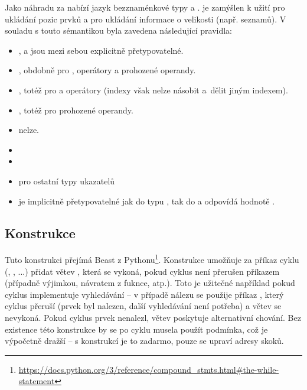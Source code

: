 Jako náhradu za  nabízí jazyk bezznaménkové typy  a .  je zamýšlen k užití pro ukládání pozic prvků a  pro ukládání informace o velikosti (např. seznamů). V souladu s touto sémantikou byla zavedena následující pravidla:
\begin{itemize}
	\item {},  a  jsou mezi sebou explicitně přetypovatelné.
	\item {}, obdobně pro , operátory \inlineCode{\- * /} a prohozené operandy.
	\item {}, totéž pro  a operátory \inlineCode{\- * /} (indexy však nelze násobit a~dělit jiným indexem).
	\item {}, totéž pro prohozené operandy.
	\item {} nelze.
	\item {}
	\item {}
	\item {} pro ostatní typy ukazatelů
	\item {} je implicitně přetypovatelné jak do typu , tak do  a odpovídá hodnotě .
\end{itemize}

\subsection{Konstrukce }
Tuto konstrukci přejímá Beast z Pythonu\footnote{\url{https://docs.python.org/3/reference/compound_stmts.html\#the-while-statement}}. Konstrukce umožňuje za příkaz cyklu (, , ...) přidat větev , která se vykoná, pokud cyklus není přerušen příkazem  (případně výjimkou, návratem z fuknce, atp.). Toto je užitečné například pokud cyklus implementuje vyhledávání -- v případě nálezu se použije příkaz , který cyklus přeruší (prvek byl nalezen, další vyhledávání není potřeba) a větev  se nevykoná. Pokud cyklus prvek nenalezl, větev  poskytuje alternativní chování. Bez existence této konstrukce by se po cyklu musela použít podmínka, což je výpočetně dražší -- s konstrukcí  je to zadarmo, pouze se upraví adresy skoků.

